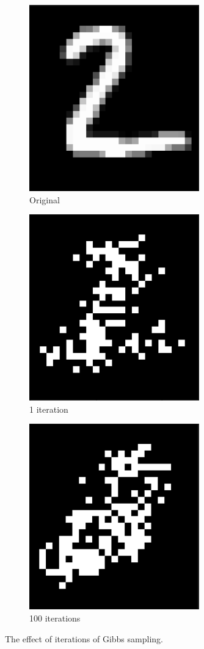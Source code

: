\documentclass[a4paper,10pt]{article}
\begin{document}
\begin{figure}[ht]
	\begin{subfigure}{0.32\textwidth}
		\centering
		\includegraphics[width=0.5\linewidth]{0iter_gibbs.png}
		\caption{Original}
		\label{fig:0iter}
	\end{subfigure}	 	
	\begin{subfigure}{0.32\textwidth}
		\centering
		\includegraphics[width=0.5\linewidth]{1iter_gibbs.png}
		\caption{1 iteration}
		\label{fig:1iter}
	\end{subfigure}	
	\begin{subfigure}{0.32\textwidth}
		\centering
		\includegraphics[width=0.5\linewidth]{100iter_gibbs.png}
		\caption{100 iterations}
		\label{fig:100iter}
	\end{subfigure}
	\caption{The effect of iterations of Gibbs sampling.}
	\label{fig:gibbssampeling}
\end{figure}
\end{document}
